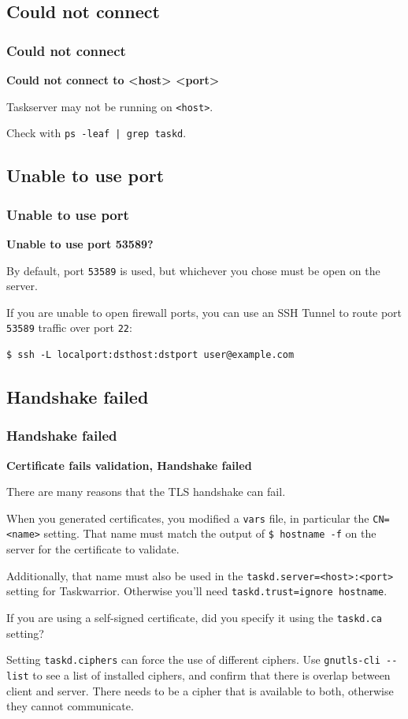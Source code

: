 \documentclass[t,handout]{beamer}
\begin{document}
\subsection{Could not connect}

\begin{frame}[fragile]\frametitle{Could not connect}
    \textbf{Could not connect to <host> <port>}

    Taskserver may not be running on \verb+<host>+.

    Check with \verb+ps -leaf | grep taskd+.
\end{frame}

\subsection{Unable to use port}

\begin{frame}[fragile]\frametitle{Unable to use port}
    \textbf{Unable to use port 53589?}

    By default, port \verb+53589+ is used, but whichever you chose must be open on the server.

    If you are unable to open firewall ports, you can use an SSH Tunnel to route port \verb+53589+ traffic over port \verb+22+:

    \begin{lstlisting}
$ ssh -L localport:dsthost:dstport user@example.com\end{lstlisting}
\end{frame}

\subsection{Handshake failed}

\begin{frame}[fragile]\frametitle{Handshake failed}
    \textbf{Certificate fails validation, Handshake failed}

    There are many reasons that the TLS handshake can fail.

    When you generated certificates, you modified a \verb+vars+ file, in particular the \verb+CN=<name>+ setting. That name must match the output of  \verb+$ hostname -f+ on the server for the certificate to validate.

    Additionally, that name must also be used in the \verb+taskd.server=<host>:<port>+ setting for Taskwarrior. Otherwise you'll need \verb+taskd.trust=ignore hostname+.

    If you are using a self-signed certificate, did you specify it using the \verb+taskd.ca+ setting?

    Setting \verb+taskd.ciphers+ can force the use of different ciphers. Use \verb+gnutls-cli --list+ to see a list of installed ciphers, and confirm that there is overlap between client and server. There needs to be a cipher that is available to both, otherwise they cannot communicate.
\end{frame}
\end{document}
